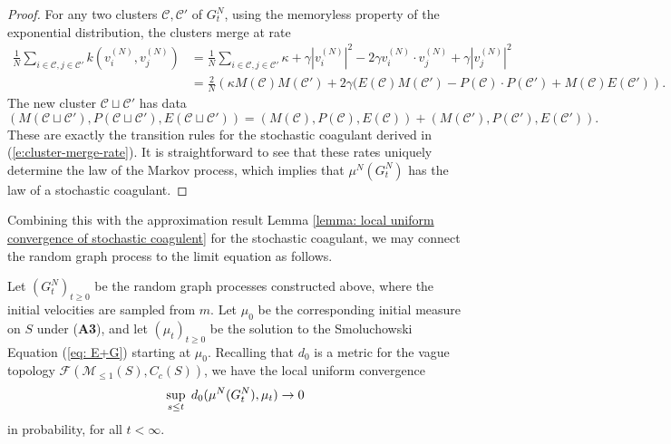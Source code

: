 \begin{proof} For any two clusters $\mathcal{C}, \mathcal{C}'$ of $G^N_t$, using the memoryless property of the exponential distribution, the clusters merge at rate \begin{equation} \begin{split}
    \frac{1}{N}\sum_{i \in \mathcal{C}, j \in \mathcal{C}'} k(v^{(N)}_i, v^{(N)}_j)& = \frac{1}{N}\sum_{i\in \mathcal{C}, j \in \mathcal{C}'} \kappa+\gamma|v^{(N)}_i|^2-2\gamma v^{(N)}_i \cdot v^{(N)}_j + \gamma|v^{(N)}_j|^2 \\ &= \frac{2}{N}\left(\kappa M(\mathcal{C})M(\mathcal{C}') +2\gamma (E(\mathcal{C})M(\mathcal{C}')-P(\mathcal{C})\cdot P(\mathcal{C}')+M(\mathcal{C}) E(\mathcal{C}')\right).
\end{split} \end{equation} The new cluster $\mathcal{C}\sqcup \mathcal{C}'$ has data \begin{equation}
    (M(\mathcal{C}\sqcup \mathcal{C}'), P(\mathcal{C}\sqcup \mathcal{C}'),E(\mathcal{C}\sqcup \mathcal{C}'))=(M(\mathcal{C}),P(\mathcal{C}), E(\mathcal{C}))+(M(\mathcal{C}'),P(\mathcal{C}'), E(\mathcal{C}')).
\end{equation}These are exactly the transition rules for the stochastic coagulant derived in (\ref{e:cluster-merge-rate}). It is straightforward to see that these rates uniquely determine the law of the Markov process, which implies that $\mu^N(G^N_t)$ has the law of a stochastic coagulant. \end{proof} Combining this with the approximation result Lemma \ref{lemma: local uniform convergence of stochastic coagulent} for the stochastic coagulant, we may connect the random graph process to the limit equation as follows. \begin{lemma}\label{lemma: convergence of random graphs} Let $(G^N_t)_{t\ge 0}$ be the random graph processes constructed above, where the initial velocities are sampled from $m$. Let $\mu_0$ be the corresponding initial measure on $S$ under (\textbf{A3}), and let $(\mu_t)_{t\ge 0}$ be the solution to the Smoluchowski Equation (\ref{eq: E+G}) starting at $\mu_0$. Recalling that $d_0$ is a metric for the vague topology $\mathcal{F}(\mathcal{M}_{\le 1}(S), C_c(S))$, we have the local uniform convergence \begin{equation}\sup_{s\le t} \hspace{0.1cm}d_0(\mu^N(G^N_t), \mu_t) \rightarrow 0 \end{equation} in probability, for all $t<\infty.$ \end{lemma} 

